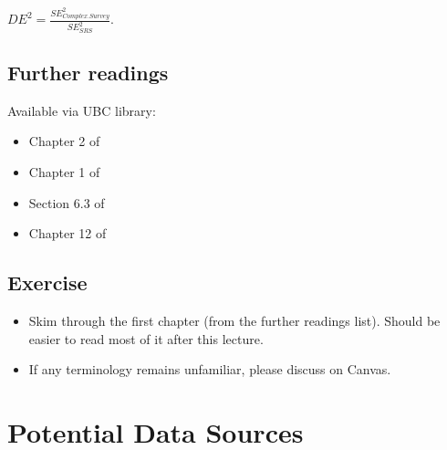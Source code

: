 \documentclass[
]{book}
\providecommand{\tightlist}{%
  \setlength{\itemsep}{0pt}\setlength{\parskip}{0pt}}
\begin{document}
\(DE^2 = \frac{SE^2_{Complex.Survey}}{SE^2_{SRS}}\).

\hypertarget{further-readings}{%
\section{Further readings}\label{further-readings}}

Available via UBC library:

\begin{itemize}
\tightlist
\item
  Chapter 2 of \citet{heeringa2017applied}
\item
  Chapter 1 of \citet{lumley2011complex}
\item
  Section 6.3 of \citet{bilder2014analysis}
\item
  Chapter 12 of \citet{vittinghoff2011regression}
\end{itemize}

\hypertarget{exercise}{%
\section{Exercise}\label{exercise}}

\begin{itemize}
\tightlist
\item
  Skim through the first chapter (from the further readings list). Should be easier to read most of it after this lecture.
\item
  If any terminology remains unfamiliar, please discuss on Canvas.
\end{itemize}

\hypertarget{potential-data-sources}{%
\chapter{Potential Data Sources}\label{potential-data-sources}}
\end{document}

